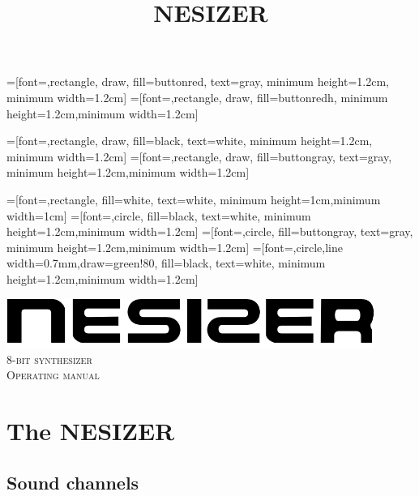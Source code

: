 \documentclass[a4paper, 12p]{extarticle}
\title{NESIZER}
\author{}
\date{}
\begin{document}

=[font=\tiny,rectangle, draw, fill=buttonred, text=gray, minimum height=1.2cm, minimum width=1.2cm]
=[font=\tiny,rectangle, draw, fill=buttonredh, minimum height=1.2cm,minimum width=1.2cm]

=[font=\tiny,rectangle, draw, fill=black, text=white, minimum height=1.2cm, minimum width=1.2cm]
=[font=\tiny,rectangle, draw, fill=buttongray, text=gray, minimum height=1.2cm,minimum width=1.2cm]

=[font=\tiny,rectangle, fill=white, text=white, minimum height=1cm,minimum width=1cm]
=[font=\tiny,circle, fill=black, text=white, minimum height=1.2cm,minimum width=1.2cm]
=[font=\tiny,circle, fill=buttongray, text=gray, minimum height=1.2cm,minimum width=1.2cm]
=[font=\tiny,circle,line width=0.7mm,draw=green!80, fill=black, text=white, minimum height=1.2cm,minimum width=1.2cm]

\begin{titlepage}
  \begin{center}
    \vfil
    \includegraphics[width=12cm]{../nesizer_black.png}\\[3cm]

    \textsc{\LARGE{8-bit synthesizer}}\\[8cm]

    \textsc{\Large{Operating manual}}
  \end{center}
\end{titlepage}

\tableofcontents


\section{The NESIZER}

\subsection{Sound channels}
\end{document}
